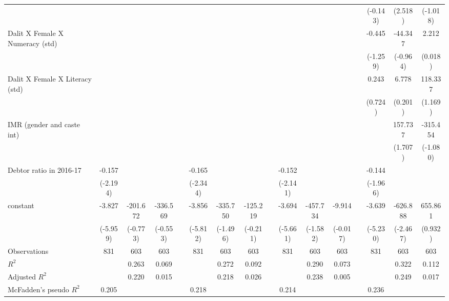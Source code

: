 {\begin{longtable}{@{\extracolsep{\fill}}lccccccccccccccc}
          &       &       &       &       &       &       &       &       &       &       &       &       & (-0.143) & (2.518) & (-1.018) \\
    Dalit X Female X Numeracy (std) &       &       &       &       &       &       &       &       &       &       &       &       & -0.445 & -44.347 & 2.212 \\
          &       &       &       &       &       &       &       &       &       &       &       &       & (-1.259) & (-0.964) & (0.018) \\
    Dalit X Female X Literacy (std) &       &       &       &       &       &       &       &       &       &       &       &       & 0.243 & 6.778 & 118.337 \\
          &       &       &       &       &       &       &       &       &       &       &       &       & (0.724) & (0.201) & (1.169) \\
    IMR (gender and caste int) &       &       &       &       &       &       &       &       &       &       &       &       &       & 157.737 & -315.454 \\
          &       &       &       &       &       &       &       &       &       &       &       &       &       & (1.707) & (-1.080) \\
    Debtor ratio in 2016-17 & -0.157 &       &       &       & -0.165 &       &       &       & -0.152 &       &       &       & -0.144 &       &  \\
          & (-2.194) &       &       &       & (-2.344) &       &       &       & (-2.141) &       &       &       & (-1.966) &       &  \\
    constant & -3.827 & -201.672 & -336.569 &       & -3.856 & -335.750 & -125.219 &       & -3.694 & -457.734 & -9.914 &       & -3.639 & -626.888 & 655.861 \\
          & (-5.959) & (-0.773) & (-0.553) &       & (-5.812) & (-1.496) & (-0.211) &       & (-5.661) & (-1.582) & (-0.017) &       & (-5.230) & (-2.467) & (0.932) \\
    \midrule
    Observations & 831 & 603 & 603 &   & 831 & 603 & 603 &   & 831 & 603 & 603 &   & 831 & 603 & 603 \\
    $R^2$ &   & 0.263 & 0.069 &   &   & 0.272 & 0.092 &   &   & 0.290 & 0.073 &   &   & 0.322 & 0.112 \\
    Adjusted $R^2$ &   & 0.220 & 0.015 &   &   & 0.218 & 0.026 &   &   & 0.238 & 0.005 &   &   & 0.249 & 0.017 \\
    McFadden's pseudo $R^2$ & 0.205 &   &   &   & 0.218 &   &   &   & 0.214 &   &   &   & 0.236 &   &  \\

\end{longtable}}
